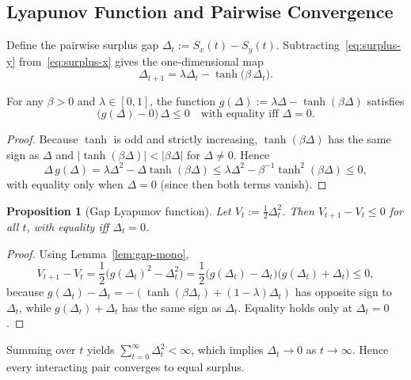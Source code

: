 \documentclass[11pt]{article}
\newtheorem{proposition}{Proposition}
\begin{document}
\subsection{Lyapunov Function and Pairwise Convergence}
Define the pairwise surplus gap $\Delta_t:=S_x(t)-S_y(t)$. Subtracting~\eqref{eq:surplus-y} from~\eqref{eq:surplus-x} gives the one‑dimensional map
\begin{equation}
    \Delta_{t+1}= \lambda\Delta_t-\tanh\!\bigl(\beta\,\Delta_t\bigr). \label{eq:gap-map}
\end{equation}
\begin{lemma}\label{lem:gap-mono}
For any $\beta>0$ and $\lambda\in[0,1]$, the function $g(\Delta):=\lambda\Delta-\tanh(\beta\Delta)$ satisfies
\[
    \bigl(g(\Delta)-\!0\bigr)\,\Delta\le0\quad\text{with equality iff }\Delta=0.
\]
\end{lemma}
\begin{proof}
Because $\tanh$ is odd and strictly increasing, $\tanh(\beta\Delta)$ has the same sign as $\Delta$ and $|\tanh(\beta\Delta)|<|\beta\Delta|$ for $\Delta\neq0$. Hence
\[
\Delta\,g(\Delta)=\lambda\Delta^2-\Delta\tanh(\beta\Delta)
                \le \lambda\Delta^2-\beta^{-1}\tanh^2(\beta\Delta)
                \le0,
\]
with equality only when $\Delta=0$ (since then both terms vanish). 
\end{proof}
\begin{proposition}[Gap Lyapunov function]\label{prop:gap-lyap}
Let $V_t:=\frac12\Delta_t^2$. Then $V_{t+1}-V_t\le0$ for all $t$, with equality iff $\Delta_t=0$.
\end{proposition}
\begin{proof}
Using Lemma~\ref{lem:gap-mono},
\[
V_{t+1}-V_t
   =\frac12\bigl(g(\Delta_t)^2-\Delta_t^2\bigr)
   =\frac12\bigl(g(\Delta_t)-\Delta_t\bigr)\bigl(g(\Delta_t)+\Delta_t\bigr)
   \le0,
\]
because $g(\Delta_t)-\Delta_t=-(\tanh(\beta\Delta_t)+(1-\lambda)\Delta_t)$ has opposite sign to $\Delta_t$, while $g(\Delta_t)+\Delta_t$ has the same sign as $\Delta_t$. Equality holds only at $\Delta_t=0$.
\end{proof}
Summing over $t$ yields $\sum_{t=0}^\infty\Delta_t^2<\infty$, which implies $\Delta_t\to0$ as $t\to\infty$. Hence every interacting pair converges to equal surplus.
\end{document}
